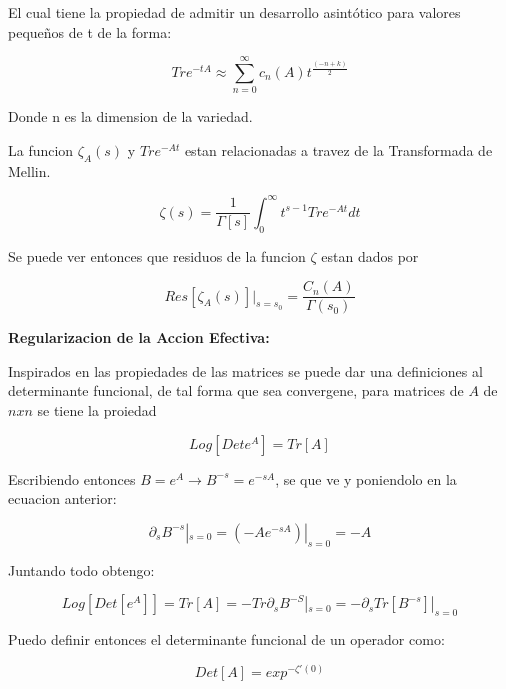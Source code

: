 El cual tiene la propiedad de admitir un desarrollo asintótico para valores pequeños de t de la forma:

\begin{equation}
Tr e ^{-t A} \approx 
\sum _{n=0} ^{\infty}
c _n (A) 
t ^{\frac{(-n+k)}{2}}
\end{equation}

Donde n es la dimension de la variedad.

La funcion $\zeta _A (s) $ y $Tr e ^{-A t}$ estan relacionadas a travez de la Transformada de Mellin.

\begin{equation}
\zeta (s) = \frac{1}{\Gamma [s] } 
\int _0 ^{\infty}
t ^{s-1} Tr e ^{-A t} dt
\end{equation}

Se puede ver entonces que residuos de la funcion $\zeta$ estan dados por

\begin{equation}
Res[\zeta _A (s)] | _{s= s_0} = \frac{C _n (A)}{\Gamma (s _0)}
\end{equation}

\textbf{Regularizacion de la Accion Efectiva:}

Inspirados en las propiedades de las matrices se puede dar una definiciones al determinante funcional, de tal forma que sea convergene, para matrices de $A $ de $ nxn$ se tiene la proiedad

\begin{equation}
Log [ Det e ^A] = Tr [A]
\end{equation}

Escribiendo entonces $B= e ^{A} \rightarrow B ^{-s} = e ^{-s A}$, se que ve y poniendolo en la ecuacion anterior:

\begin{equation}
\partial _s B ^{-s} | _{s=0} = (- A e ^{-s A}) | _{s=0} = - A
\end{equation}

Juntando todo obtengo:

\begin{equation}
Log [Det [e ^A ]] = Tr[A] = - Tr \partial _s B ^{-S} | _{s=0} = - \partial _s Tr[B ^{-s}] | _{s=0}
\end{equation}

Puedo definir entonces el determinante funcional de un operador como:

\begin{equation}
Det[A] = exp ^{- \zeta ' (0)}
\end{equation}

